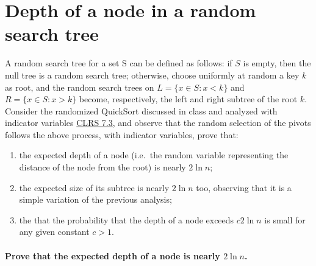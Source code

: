 \section{Depth of a node in a random search tree}

A random search tree for a set S can be defined as follows: if $S$ is empty, then
the null tree is a random search tree; otherwise, choose uniformly at random a key
$k$ as root, and the random search trees on $L = \{x \in S : x < k\}$ and $R = \{x \in S :
x > k\}$ become, respectively, the left and right subtree of the root $k$.
Consider the randomized QuickSort discussed in class and analyzed with indicator
variables \href{http://didawiki.cli.di.unipi.it/lib/exe/fetch.php/magistraleinformatica/alg2/algo2_13/randqs.pdf}{CLRS 7.3},
and observe that the random selection of the pivots follows the above process,
with indicator variables, prove that:
\begin{enumerate}
  \item the expected depth of a node (i.e.\ the random variable representing the distance of the node from the root) is nearly $2 \ln n$;
  \item the expected size of its subtree is nearly $2 \ln n$ too, observing that it is a simple variation of the previous analysis;
  \item the that the probability that the depth of a node exceeds $c2 \ln n$ is small for any given constant $c > 1$.
\end{enumerate}

\paragraph{Prove that the expected depth of a node is nearly $2 \ln n$.}

